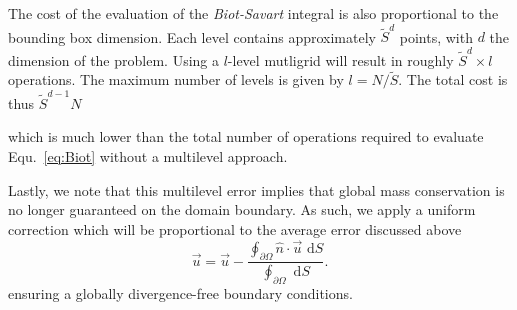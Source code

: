 \documentclass{article}
\begin{document}
The cost of the evaluation of the \emph{Biot-Savart} integral is also proportional to the bounding box dimension. Each level contains approximately $\tilde{S}^d$ points, with $d$ the dimension of the problem. Using a $l$-level mutligrid will result in roughly $\tilde{S}^d\times l$ operations. The maximum number of levels is given by $l=N/\tilde{S}$. The total cost is thus $\tilde{S}^{d-1}N$

which is much lower than the total number of operations required to evaluate Equ.~\ref{eq:Biot} without a multilevel approach.




Lastly, we note that this multilevel error implies that global mass conservation is no longer guaranteed on the domain boundary. As such, we apply a uniform correction which will be proportional to the average error discussed above
\begin{equation}
    \vec{u} = \vec{u} -\frac {\oint_{\partial\Omega }\hat{n}\cdot\vec{u}\text{ d}S} {\oint_{\partial\Omega }\text{ d}S}.
\end{equation}
ensuring a globally divergence-free boundary conditions.
\end{document}
